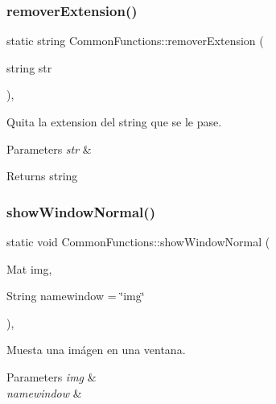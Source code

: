 \subsubsection{\texorpdfstring{remover\+Extension()}{removerExtension()}}
{\footnotesize\ttfamily static string Common\+Functions\+::remover\+Extension (\begin{DoxyParamCaption}\item[{string}]{str }\end{DoxyParamCaption})\hspace{0.3cm}{\ttfamily [inline]}, {\ttfamily [static]}}



Quita la extension del string que se le pase. 


\begin{DoxyParams}{Parameters}
{\em str} & \\
\hline
\end{DoxyParams}
\begin{DoxyReturn}{Returns}
string 
\end{DoxyReturn}
\mbox{\label{classCommonFunctions_a71529e35a71bbc74d49051d90a850c30}} 
\subsubsection{\texorpdfstring{show\+Window\+Normal()}{showWindowNormal()}}
{\footnotesize\ttfamily static void Common\+Functions\+::show\+Window\+Normal (\begin{DoxyParamCaption}\item[{Mat}]{img,  }\item[{String}]{namewindow = {\ttfamily \char`\"{}img\char`\"{}} }\end{DoxyParamCaption})\hspace{0.3cm}{\ttfamily [inline]}, {\ttfamily [static]}}



Muesta una imágen en una ventana. 


\begin{DoxyParams}{Parameters}
{\em img} & \\
\hline
{\em namewindow} & \\
\hline
\end{DoxyParams}
\mbox{\label{classCommonFunctions_a00300c316aebf02cd5917c7335247fba}} 
